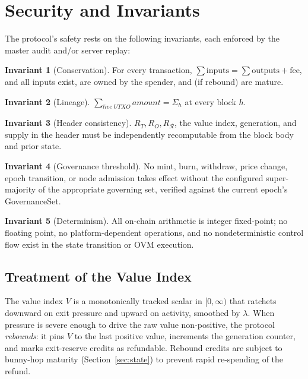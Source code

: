 \documentclass[11pt,a4paper]{article}
\theoremstyle{definition}
\newtheorem{invariant}{Invariant}
\newcommand{\ovm}{\textsf{OVM}}
\begin{document}
\section{Security and Invariants}
\label{sec:security}
\label{sec:analysis}

The protocol's safety rests on the following invariants, each enforced by the
master audit and/or server replay:

\begin{invariant}[Conservation]
For every transaction, $\sum \mathrm{inputs} = \sum \mathrm{outputs} + \mathrm{fee}$,
and all inputs exist, are owned by the spender, and (if rebound) are mature.
\end{invariant}

\begin{invariant}[Lineage]
$\sum_{\mathit{live\;UTXO}} \mathit{amount} = \Sigma_h$ at every block $h$.
\end{invariant}

\begin{invariant}[Header consistency]
$R_T, R_O, R_{\mathcal{R}}$, the value index, generation, and supply in the header
must be independently recomputable from the block body and prior state.
\end{invariant}

\begin{invariant}[Governance threshold]
No mint, burn, withdraw, price change, epoch transition, or node admission
takes effect without the configured super-majority of the appropriate
governing set, verified against the current epoch's GovernanceSet.
\end{invariant}

\begin{invariant}[Determinism]
All on-chain arithmetic is integer fixed-point; no floating point, no
platform-dependent operations, and no nondeterministic control flow exist in the
state transition or \ovm{} execution.
\end{invariant}

\subsection{Treatment of the Value Index}
\label{sec:bunnyhop}

The value index $V$ is a monotonically tracked scalar in $[0, \infty)$ that
ratchets downward on exit pressure and upward on activity, smoothed by
$\lambda$.  When pressure is severe enough to drive the raw value non-positive,
the protocol \emph{rebounds}: it pins $V$ to the last positive value, increments
the generation counter, and marks exit-reserve credits as refundable.  Rebound
credits are subject to bunny-hop maturity (Section~\ref{sec:state}) to prevent
rapid re-spending of the refund.
\end{document}
